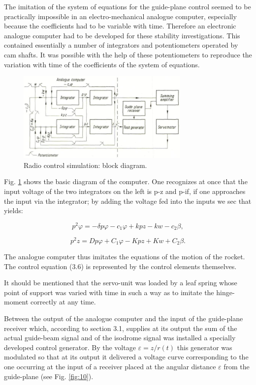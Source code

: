 \documentclass[12pt, a4paper]{article}
\begin{document}
The imitation of the system of equations for the guide-plane control seemed to be practically impossible in an electro-mechanical analogue computer, especially because the coefficients had to be variable with time. Therefore an electronic analogue computer had to be developed for these stability investigations. This contained essentially a number of integrators and potentiometers operated by cam shafts. It was possible with the help of these potentiometers to reproduce the variation with time of the coefficients of the system of equations.

\begin{figure}[ht]
  \centering
  \includegraphics[width=0.75\textwidth]{figs/ctrl-13.png}
  \caption{Radio control simulation: block diagram.}
  \label{fig:13}
\end{figure}

Fig. \ref{fig:13} shows the basic diagram of the computer. One recognizes at once that the input voltage of the two integrators on the left is p-z and p-if, if one approaches the input via the integrator; by adding the voltage fed into the inputs we sec that yields:

\begin{equation}
  p^{2}\varphi=-\delta p\varphi-c_{1}\varphi+kpz-kw-c_{2}\beta,
\end{equation}

\begin{equation}
  p^{2}z=Dp\varphi+C_{1}\varphi-Kpz+Kw+C_{2}\beta.
\end{equation}

The analogue computer thus imitates the equations of the motion of the rocket. The control equation (3.6) is represented by the control elements themselves.

It should be mentioned that the servo-unit was loaded by a leaf spring whose point of support was varied with time in such a way as to imitate the hinge-moment correctly at any time.

Between the output of the analogue computer and the input of the guide-plane receiver which, according to section 3.1, supplies at its output the sum of the actual guide-beam signal and of the isodrome signal was installed a specially developed control generator. By the voltage $\varepsilon=z/r(t)$ this generator was modulated so that at its output it delivered a voltage curve corresponding to the one occurring at the input of a receiver placed at the angular distance $\varepsilon$ from the guide-plane (see Fig. \ref{fig:10}).
\end{document}
